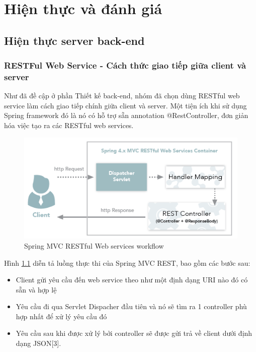 \documentclass[11pt,a4paper,oneside]{book}
\begin{document}
\chapter{Hiện thực và đánh giá}
\newpage
\section{Hiện thực server back-end}

\subsection{RESTFul Web Service - Cách thức giao tiếp giữa client và server}

Như đã đề cập ở phần Thiết kế back-end, nhóm đã chọn dùng RESTful web service làm cách giao tiếp chính giữa client và server. Một tiện ích khi sử dụng Spring framework đó là nó có hỗ trợ sẵn annotation @RestController, đơn giản hóa việc tạo ra các RESTful web services.

\begin{figure}[h]
  \centering
     \includegraphics[width=12cm]{6-spring-RESTfulWS-workflow}
  \caption{Spring MVC RESTful Web services workflow}\label{fig:6-spring-RESTfulWS-workflow}
\end{figure} 

Hình \ref{fig:6-spring-RESTfulWS-workflow} diễn tả luồng thực thi của Spring MVC REST, bao gồm các bước sau:

\begin{itemize}[topsep=1mm,itemsep=-0.5mm]
\item Client gửi yêu cầu đến web service theo như một định dạng URI nào đó có sẵn và hợp lệ
\item Yêu cầu đi qua Servlet Dispacher đầu tiên và nó sẽ tìm ra 1 controller phù hợp nhất để xử lý yêu cầu đó
\item Yêu cầu sau khi được xử lý bởi controller sẽ được gửi trả về client dưới định dạng JSON[3].
\vspace{1mm}
\end{itemize}
\end{document}
